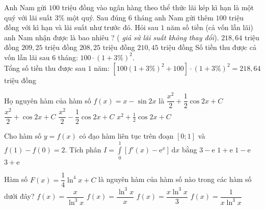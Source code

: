 \begin{ex}%
	Anh Nam gửi $100$ triệu đồng vào ngân hàng theo thể thức lãi kép kì hạn là một quý với lãi suất $3\%$ một quý. Sau đúng $6$ tháng anh Nam gửi thêm $100$ triệu đồng với kì hạn và lãi suất như trước đó. Hỏi sau $1$ năm số tiền (cả vốn lẫn lãi) anh Nam nhận được là bao nhiêu ? ( \textit{giả sử lãi suất không thay đổi}).
	\choice
	{\True $218,64$ triệu đồng}
	{$209,25$ triệu đồng}
	{$208,25$ triệu đồng}
	{$210,45$ triệu đồng}
	\loigiai
	{
		Số tiền thu được cả vốn lẫn lãi sau $6$ tháng: $100 \cdot(1+3 \%)^{2}$.\\
		Tổng số tiền thu được sau $1$ năm: $\left[100(1+3 \%)^{2}+100\right] \cdot(1+3 \%)^{2}=218,64$ triệu đồng
	}
\end{ex}

\begin{ex}%
	Họ nguyên hàm của hàm số $f(x)=x-\sin2x$ là
	\choice
	{\True $\dfrac{x^2}{2}+\dfrac{1}{2}\cos2x+C$}
	{$\dfrac{x^2}{2}+\cos2x+C$}
	{$\dfrac{x^2}{2}-\dfrac{1}{2}\cos2x+C$}
	{$x^2+\tfrac{1}{2}\cos 2x+C$}
\end{ex}


\begin{ex}%
	Cho hàm số $y=f(x)$ có đạo hàm liên tục trên đoạn $[0;1]$ và  $f(1)-f(0)=2$. Tích phân $I=\displaystyle\int\limits_{0}^{1} {\left[f'(x)-\mathrm{e}^x\right]}\mathrm{\,d}x$ bằng
	\choice
	{\True $3-\mathrm{e}$}
	{$1+\mathrm{e}$}
	{$1-\mathrm{e}$}
	{$3+\mathrm{e}$}
\end{ex}

\begin{ex}%
	Hàm số $F(x)=\dfrac{1}{4}\ln ^4x+C$ là nguyên hàm của hàm số nào trong các hàm số dưới đây?
	\choice
	{$f(x)=\dfrac{x}{\ln ^3x}$}
	{\True $f(x)=\dfrac{\ln ^3x}{x}$}
	{$f(x)=\dfrac{x\ln ^3x}{3}$}
	{$f(x)=\dfrac{1}{x\ln ^3x}$}
\end{ex}

